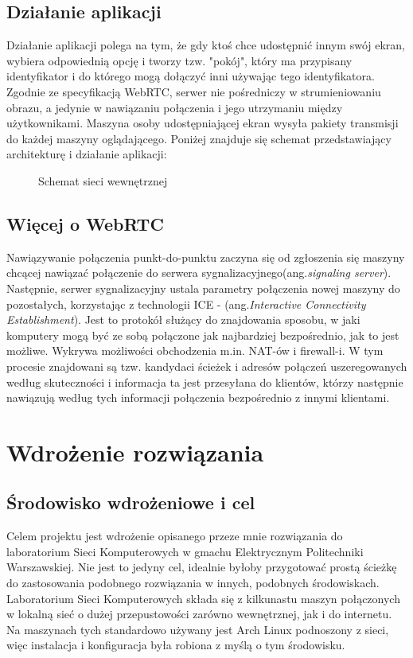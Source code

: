 \documentclass[a4paper,11pt]{article}
\begin{document}
        \subsection{Działanie aplikacji}
        Działanie aplikacji polega na tym, że gdy ktoś chce udostępnić innym swój ekran, wybiera odpowiednią opcję i tworzy tzw. "pokój", 
        który ma przypisany identyfikator i do którego mogą dołączyć inni używając tego identyfikatora. 
        Zgodnie ze specyfikacją WebRTC, serwer nie pośredniczy w strumieniowaniu obrazu, a jedynie w nawiązaniu połączenia i jego utrzymaniu między użytkownikami.   
        Maszyna osoby udostępniającej ekran wysyła pakiety transmisji do każdej maszyny oglądającego. 
        Poniżej znajduje się schemat przedstawiający architekturę i działanie aplikacji: 
        \begin{figure}[!ht]
        \centering
        \def\svgwidth{\columnwidth}
        
        \caption{Schemat sieci wewnętrznej}
        \label{rys1:label}
        \end{figure}
        \subsection{Więcej o WebRTC}
        Nawiązywanie połączenia punkt-do-punktu zaczyna się od zgłoszenia się maszyny chcącej nawiązać połączenie do serwera sygnalizacyjnego(ang.\emph{signaling server}).
        Następnie, serwer sygnalizacyjny ustala parametry połączenia nowej maszyny do pozostałych, korzystając z technologii ICE - (ang.\emph{Interactive Connectivity Establishment}).
        Jest to protokół służący do znajdowania sposobu, w jaki komputery mogą być ze sobą połączone jak najbardziej bezpośrednio, jak to jest możliwe. 
        Wykrywa możliwości obchodzenia m.in. NAT-ów i firewall-i. 
        W tym procesie znajdowani są tzw. kandydaci ścieżek i adresów połączeń uszeregowanych według skuteczności i informacja ta jest przesyłana do klientów, 
        którzy następnie nawiązują według tych informacji połączenia bezpośrednio z innymi klientami.  
    \section{Wdrożenie rozwiązania} 
        \subsection{Środowisko wdrożeniowe i cel}
        Celem projektu jest wdrożenie opisanego przeze mnie rozwiązania do laboratorium Sieci Komputerowych w gmachu Elektrycznym Politechniki Warszawskiej. 
        Nie jest to jedyny cel, idealnie byłoby przygotować prostą ścieżkę do zastosowania podobnego rozwiązania w innych, podobnych środowiskach.    
        Laboratorium Sieci Komputerowych składa się z kilkunastu maszyn połączonych w lokalną sieć o dużej przepustowości zarówno wewnętrznej, jak i do internetu.
        Na maszynach tych standardowo używany jest Arch Linux podnoszony z sieci, więc instalacja i konfiguracja była robiona z myślą o tym środowisku.  
\end{document}
